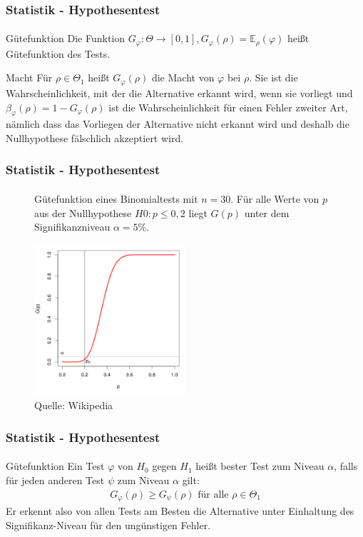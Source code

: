 \documentclass{beamer}
\begin{document}
\begin{frame}
    \frametitle{Statistik - Hypothesentest}
\framesubtitle{}
\begin{block}{Gütefunktion}
Die Funktion $G_{\varphi}: \Theta \to [0,1], G_{\varphi}(\rho) = \mathbb{E}_{\rho}(\varphi)$ heißt Gütefunktion des Tests.
\end{block}
\begin{block}{Macht}
Für $\rho \in \Theta_1$ heißt  $ G_{\varphi}(\rho)$ die Macht von $\varphi$ bei $\rho$. Sie ist die Wahrscheinlichkeit, mit der die Alternative erkannt wird, wenn sie vorliegt und $\beta_{\varphi}(\rho) = 1 - G_{\varphi}(\rho)$ ist die Wahrscheinlichkeit für einen Fehler zweiter Art, nämlich dass das Vorliegen der Alternative nicht erkannt wird und deshalb die Nullhypothese fälschlich akzeptiert wird.
\end{block}
 \end{frame}

\begin{frame}
    \frametitle{Statistik - Hypothesentest}
\framesubtitle{}

\begin{figure}[htp]
      \centering
Gütefunktion eines Binomialtests mit $n = 30$. Für alle Werte von $p$ aus der Nullhypothese $H0: p \leq 0,2$ liegt $G(p)$ unter dem Signifikanzniveau $\alpha = 5 \%$.

      \centering
    \includegraphics[width=0.5\textwidth]{img/Power_function_binomial_test}
\caption{Quelle: Wikipedia}
\end{figure}

 \end{frame}



\begin{frame}
    \frametitle{Statistik - Hypothesentest}
\framesubtitle{}
\begin{block}{Gütefunktion}
Ein Test $\varphi$ von $H_0$ gegen $H_1$ heißt bester Test zum Niveau $\alpha$, falls für jeden anderen Test $\psi$ zum 
 Niveau $\alpha$ gilt:
\begin{align*}
G_{\varphi}(\rho) \geq G_{\psi}(\rho) \text{ für alle } \rho \in \Theta_1
\end{align*}
Er erkennt also von allen Tests am Besten die Alternative unter Einhaltung  des Signifikanz-Niveau für den ungünstigen Fehler.
\end{block}

 \end{frame}
\end{document}
